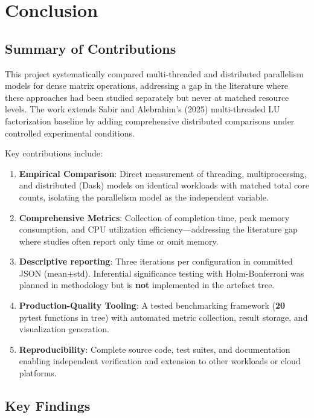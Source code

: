 \chapter{Conclusion}

\section{Summary of Contributions}

This project systematically compared multi-threaded and distributed parallelism models for dense matrix operations, addressing a gap in the literature where these approaches had been studied separately but never at matched resource levels. The work extends Sabir and Alebrahim's (2025) multi-threaded LU factorization baseline by adding comprehensive distributed comparisons under controlled experimental conditions.

Key contributions include:

\begin{enumerate}
    \item \textbf{Empirical Comparison}: Direct measurement of threading, multiprocessing, and distributed (Dask) models on identical workloads with matched total core counts, isolating the parallelism model as the independent variable.
    
    \item \textbf{Comprehensive Metrics}: Collection of completion time, peak memory consumption, and CPU utilization efficiency—addressing the literature gap where studies often report only time or omit memory.
    
    \item \textbf{Descriptive reporting}: Three iterations per configuration in committed JSON (mean$\pm$std). Inferential significance testing with Holm-Bonferroni was planned in methodology but is \textbf{not} implemented in the artefact tree.
    
    \item \textbf{Production-Quality Tooling}: A tested benchmarking framework (\textbf{20} pytest functions in tree) with automated metric collection, result storage, and visualization generation.
    
    \item \textbf{Reproducibility}: Complete source code, test suites, and documentation enabling independent verification and extension to other workloads or cloud platforms.
\end{enumerate}

\section{Key Findings}

